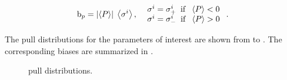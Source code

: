 \begin{equation}
{\rm b}_p = \left|\left<P\right>\right| \; \left<\sigma^i\right>,\;\; \left.
  \begin{array}{ll}
    \sigma^i = \sigma^i_+ \;\;{\rm if}\;\; \left<P\right> < 0 \\
    \sigma^i = \sigma^i_- \;\;{\rm if}\;\; \left<P\right> > 0
  \end{array} \right. .
\label{bias_def}
\end{equation}

The pull distributions for the parameters of interest are shown from  to .
The corresponding biases are summarized in .


\begin{figure}[!t]
  \centering
  \begin{subfigure}{0.5\textwidth}
    \raggedright
    \scalebox{0.56}{}
    \caption{}
    \label{pull_ASMag2_bin3}
  \end{subfigure}%
  \hfill%
  \begin{subfigure}{0.5\textwidth}
    \raggedleft
    \scalebox{0.56}{}
    \caption{}
    \label{pull_ASPhase_bin3}
  \end{subfigure}
  \begin{subfigure}{0.5\textwidth}
    \raggedright
    \scalebox{0.56}{}
    \caption{}
    \label{pull_ASMag2_bin4}
  \end{subfigure}%
  \hfill%
  \begin{subfigure}{0.5\textwidth}
    \raggedleft
    \scalebox{0.56}{}
    \caption{}
    \label{pull_ASPhase_bin4}
  \end{subfigure}
\caption{\swave pull distributions.}
\label{pull_swave_4}
\end{figure}

